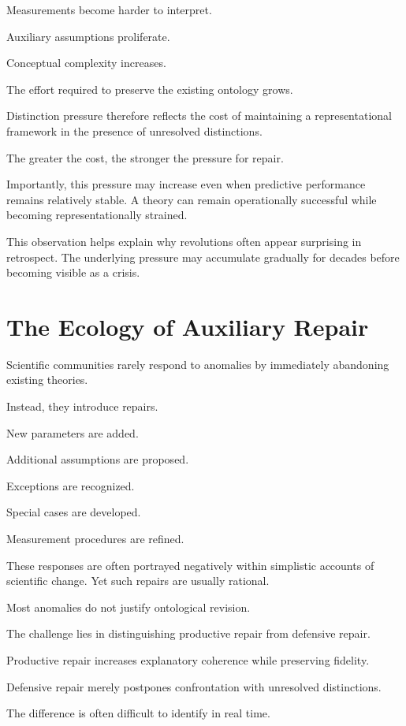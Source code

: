 \documentclass[11pt,oneside,openany]{book}
\begin{document}
Measurements become harder to interpret.

Auxiliary assumptions proliferate.

Conceptual complexity increases.

The effort required to preserve the existing ontology grows.

Distinction pressure therefore reflects the cost of maintaining a representational framework in the presence of unresolved distinctions.

The greater the cost, the stronger the pressure for repair.

Importantly, this pressure may increase even when predictive performance remains relatively stable. A theory can remain operationally successful while becoming representationally strained.

This observation helps explain why revolutions often appear surprising in retrospect. The underlying pressure may accumulate gradually for decades before becoming visible as a crisis.

\section{The Ecology of Auxiliary Repair}

Scientific communities rarely respond to anomalies by immediately abandoning existing theories.

Instead, they introduce repairs.

New parameters are added.

Additional assumptions are proposed.

Exceptions are recognized.

Special cases are developed.

Measurement procedures are refined.

These responses are often portrayed negatively within simplistic accounts of scientific change. Yet such repairs are usually rational.

Most anomalies do not justify ontological revision.

The challenge lies in distinguishing productive repair from defensive repair.

Productive repair increases explanatory coherence while preserving fidelity.

Defensive repair merely postpones confrontation with unresolved distinctions.

The difference is often difficult to identify in real time.
\end{document}
